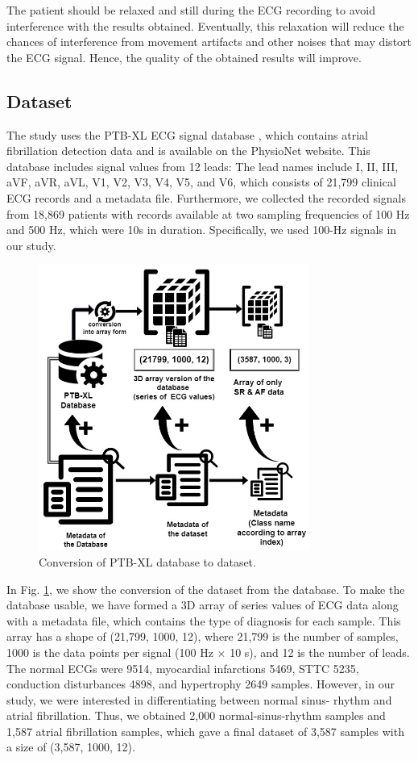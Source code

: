 \documentclass[conference]{IEEEtran}
\begin{document}
The patient should be relaxed and still during the ECG recording to avoid interference with the results obtained. Eventually, this relaxation will reduce the chances of interference from movement artifacts and other noises that may distort the ECG signal. Hence, the quality of the obtained results will improve.

\subsection{Dataset}

The study uses the PTB-XL ECG signal database \cite{wagner2020ptb}, which contains atrial fibrillation detection data and is available on the PhysioNet website. This database includes signal values from 12 leads: The lead names include I, II, III, aVF, aVR, aVL, V1, V2, V3, V4, V5, and V6, which consists of 21,799 clinical ECG records and a metadata file. Furthermore, we collected the recorded signals from 18,869 patients with records available at two sampling frequencies of 100 Hz and 500 Hz, which were 10s in duration. Specifically, we used 100-Hz signals in our study.

\begin{figure}[htbp]
\centerline{\includegraphics[width=3.5in]{4-Conversion.jpg}}
\caption{Conversion of PTB-XL database to dataset.}
\label{fig-4:Conversion}
\end{figure}

In Fig. \ref{fig-4:Conversion}, we show the conversion of the dataset from the database. To make the database usable, we have formed a 3D array of series values of ECG data along with a metadata file, which contains the type of diagnosis for each sample. This array has a shape of (21,799, 1000, 12), where 21,799 is the number of samples, 1000 is the data points per signal (100 Hz $\times$ 10 s), and 12 is the number of leads. The normal ECGs were 9514, myocardial infarctions 5469, STTC 5235, conduction disturbances 4898, and hypertrophy 2649 samples. However, in our study, we were interested in differentiating between normal sinus- rhythm and atrial fibrillation. Thus, we obtained 2,000 normal-sinus-rhythm samples and 1,587 atrial fibrillation samples, which gave a final dataset of 3,587 samples with a size of (3,587, 1000, 12).
\end{document}
